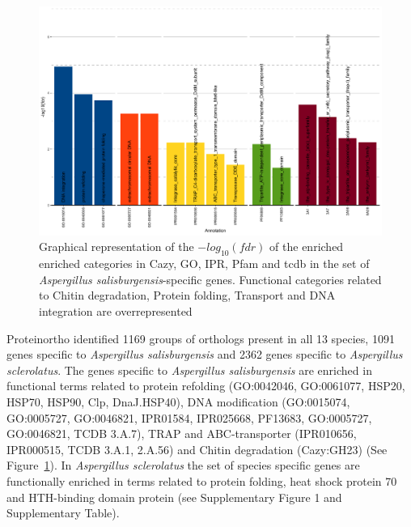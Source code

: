 \documentclass[jof,article,submit,moreauthors,pdftex,10pt,a4paper]{Definitions/mdpi}
\newcommand{\phiSp}{\textit{Aspergillus salisburgensis}}
\newcommand{\phiScl}{\textit{Aspergillus sclerolatus}}
\begin{document}
\begin{figure}[htbp]
    \centering
    \includegraphics[width=0.9\linewidth]{toPlot_specificToPhiSp.pdf}
    \caption{Graphical representation of the $-log_10(fdr)$ of the enriched enriched categories in Cazy, GO, IPR, Pfam and tcdb in the set of {\phiSp}-specific genes. Functional categories related to Chitin degradation, Protein folding, Transport and DNA integration are overrepresented}
    \label{fig:spec}
\end{figure}


Proteinortho identified 1169 groups of orthologs present in all 13 species, 1091 genes specific to \phiSp{} and 2362 genes specific to \phiScl{}. The genes specific to \phiSp{} are enriched in functional terms related to protein refolding (GO:0042046, GO:0061077, HSP20, HSP70, HSP90, Clp, DnaJ.HSP40), DNA modification (GO:0015074, GO:0005727, GO:0046821, IPR01584, IPR025668, PF13683, GO:0005727, GO:0046821, TCDB 3.A.7), TRAP and ABC-transporter (IPR010656, IPR000515, TCDB 3.A.1, 2.A.56) and Chitin degradation (Cazy:GH23) (See Figure~\ref{fig:spec}). In \phiScl{} the set of species specific genes are functionally enriched in terms related to protein folding, heat shock protein 70 and HTH-binding domain protein (see Supplementary Figure 1 and Supplementary Table).
\end{document}
